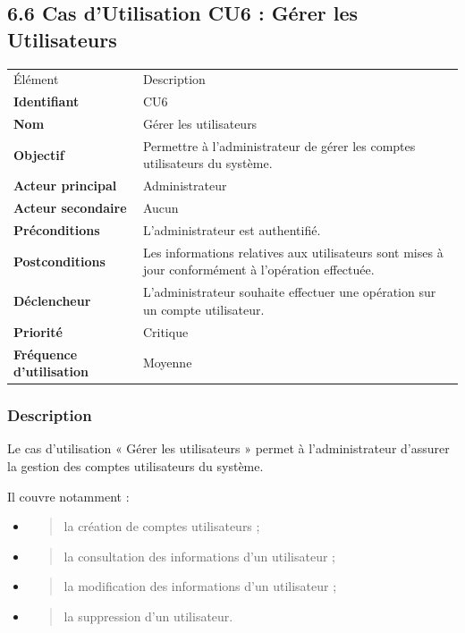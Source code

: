 \documentclass[
]{article}
\begin{document}
\hypertarget{cas-dutilisation-cu6-guxe9rer-les-utilisateurs}{%
\subsection{6.6 Cas d'Utilisation CU6 : Gérer les
Utilisateurs}\label{cas-dutilisation-cu6-guxe9rer-les-utilisateurs}}

\begin{longtable}[]{@{}ll@{}}
\toprule
\endhead
Élément & Description \\
\textbf{Identifiant} & CU6 \\
\textbf{Nom} & Gérer les utilisateurs \\
\textbf{Objectif} & Permettre à l'administrateur de gérer les comptes
utilisateurs du système. \\
\textbf{Acteur principal} & Administrateur \\
\textbf{Acteur secondaire} & Aucun \\
\textbf{Préconditions} & L'administrateur est authentifié. \\
\textbf{Postconditions} & Les informations relatives aux utilisateurs
sont mises à jour conformément à l'opération effectuée. \\
\textbf{Déclencheur} & L'administrateur souhaite effectuer une opération
sur un compte utilisateur. \\
\textbf{Priorité} & Critique \\
\textbf{Fréquence d'utilisation} & Moyenne \\
\bottomrule
\end{longtable}

\hypertarget{description-4}{%
\subsubsection{Description}\label{description-4}}

Le cas d'utilisation « Gérer les utilisateurs » permet à
l'administrateur d'assurer la gestion des comptes utilisateurs du
système.

Il couvre notamment :

\begin{itemize}
\item
  \begin{quote}
  la création de comptes utilisateurs ;
  \end{quote}
\item
  \begin{quote}
  la consultation des informations d'un utilisateur ;
  \end{quote}
\item
  \begin{quote}
  la modification des informations d'un utilisateur ;
  \end{quote}
\item
  \begin{quote}
  la suppression d'un utilisateur.
  \end{quote}
\end{itemize}
\end{document}
